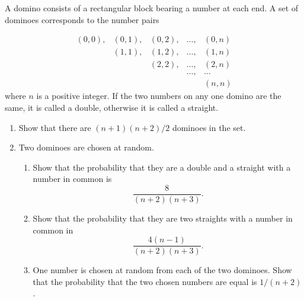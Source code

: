 \begin{problem}
    A domino consists of a rectangular block bearing a number at each end. A set of dominoes corresponds to the number pairs

    \[\begin{array}{ccccc}
        (0,0), & (0, 1), & (0, 2), & \ldots, & (0, n)\\
        & (1, 1), & (1, 2), & \ldots, & (1, n)\\
        & & (2, 2), & \ldots, & (2, n)\\
        & & & \ldots, & \ldots\\
        & & & & (n, n)
    \end{array}\]
    where $n$ is a positive integer. If the two numbers on any one domino are the same, it is called a double, otherwise it is called a straight.

    \begin{enumerate}
        \item Show that there are $(n+1)(n+2)/2$ dominoes in the set.
        \item Two dominoes are chosen at random.
        \begin{enumerate}
            \item Show that the probability that they are a double and a straight with a number in common is \[\frac{8}{(n+2)(n+3)}.\]
            \item Show that the probability that they are two straights with a number in common in \[\frac{4(n-1)}{(n+2)(n+3)}.\]
            \item One number is chosen at random from each of the two dominoes. Show that the probability that the two chosen numbers are equal is $1/(n+2)$.
        \end{enumerate}
    \end{enumerate}
\end{problem}

